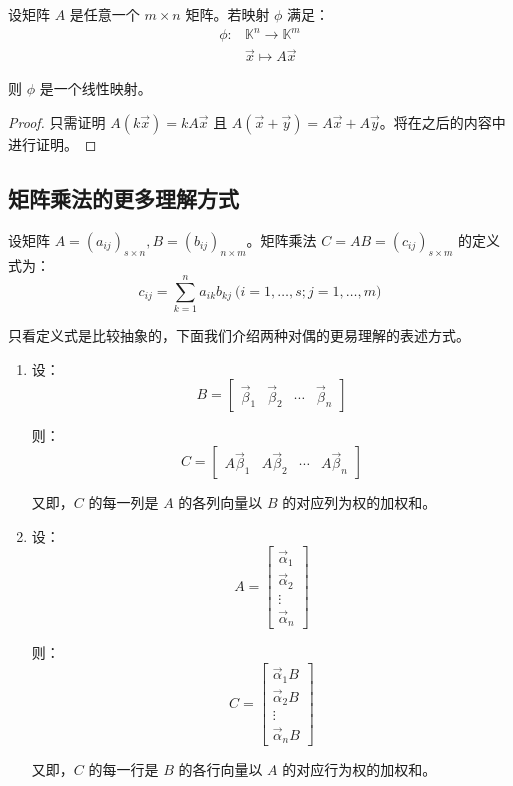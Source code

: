 \begin{theorem}
	设矩阵 $A$ 是任意一个 $m \times n$ 矩阵。若映射 $\phi$ 满足：
	$$
	\begin{aligned}
		\phi \colon & \mathbb K^n \to \mathbb K^m
		\\&
		\vec x \mapsto A \vec x
	\end{aligned}
	$$

	则 $\phi$ 是一个线性映射。
\end{theorem}

\begin{proof}
	只需证明 $A (k \vec x) = kA \vec x$ 且 $A (\vec x + \vec y) = A \vec x + A \vec y$。将在之后的内容中进行证明。
\end{proof}

\subsection{矩阵乘法的更多理解方式}

设矩阵 $A = (a_{ij})_{s \times n}, B = (b_{ij})_{n \times m}$。矩阵乘法 $C = AB = (c_{ij})_{s \times m}$ 的定义式为：
$$
c_{ij} = \sum\limits_{k = 1}^n a_{ik} b_{kj} \pod{i = 1, \ldots, s; j = 1, \ldots, m}
$$

只看定义式是比较抽象的，下面我们介绍两种对偶的更易理解的表述方式。

\begin{enumerate}
	\item 设：
	$$
	B = \begin{bmatrix} \vec \beta_1 & \vec \beta_2 & \cdots & \vec \beta_n \end{bmatrix}
	$$

	则：
	$$
	C = \begin{bmatrix} A \vec \beta_1 & A \vec \beta_2 & \cdots & A \vec \beta_n \end{bmatrix}
	$$

	又即，$C$ 的每一列是 $A$ 的各列向量以 $B$ 的对应列为权的加权和。


	\item 设：
	$$
	A = \begin{bmatrix} \vec \alpha_1 \\ \vec \alpha_2 \\ \vdots \\ \vec \alpha_n \end{bmatrix}
	$$

	则：
	$$
	C = \begin{bmatrix} \vec \alpha_1 B \\ \vec \alpha_2 B \\ \vdots \\ \vec \alpha_n B \end{bmatrix}
	$$

	又即，$C$ 的每一行是 $B$ 的各行向量以 $A$ 的对应行为权的加权和。
\end{enumerate}

